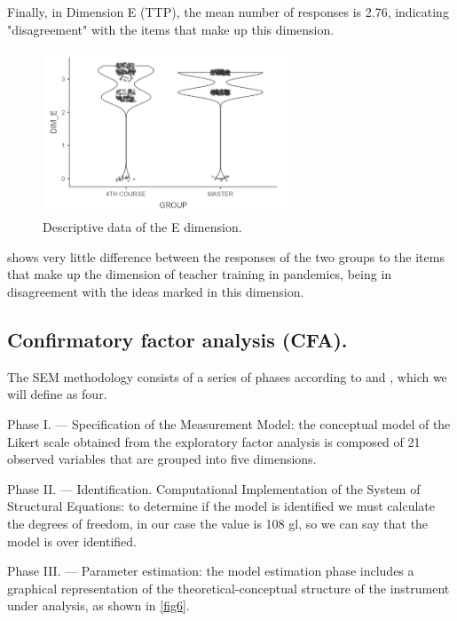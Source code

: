 \documentclass[english]{textolivre}
\begin{document}
Finally, in Dimension E (TTP), the mean number of responses is 2.76, indicating "disagreement" with the items that make up this dimension.

\begin{figure}[htbp]
 \centering
 \includegraphics[width=0.65\textwidth]{fig5.png}
 \caption{Descriptive data of the E dimension.}
 \label{fig5}
\end{figure}

 shows very little difference between the responses of the two groups to the items that make up the dimension of teacher training in pandemics, being in disagreement with the ideas marked in this dimension.

\subsection{Confirmatory factor analysis (CFA).}
The SEM methodology consists of a series of phases according to \textcite{kaplan2000} %
and \textcite{kline2005}, %
which we will define as four.

Phase I. — Specification of the Measurement Model: the conceptual model of the Likert scale obtained from the exploratory factor analysis is composed of 21 observed variables that are grouped into five dimensions.

Phase II. — Identification. Computational Implementation of the System of Structural Equations: to determine if the model is identified we must calculate the degrees of freedom, in our case the value is 108 gl, so we can say that the model is over identified.

Phase III. — Parameter estimation: the model estimation phase includes a graphical representation of the theoretical-conceptual structure of the instrument under analysis, as shown in \cref{fig6}.
\end{document}
